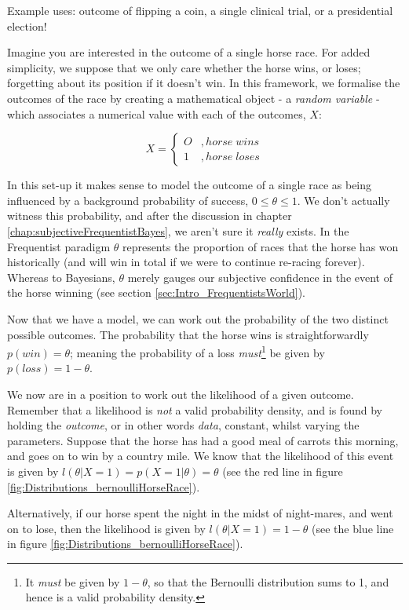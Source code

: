 \documentclass[11pt,fullpage]{book}
\begin{document}
Example uses: outcome of flipping a coin, a single clinical trial, or a presidential election!

Imagine you are interested in the outcome of a single horse race. For added simplicity, we suppose that we only care whether the horse wins, or loses; forgetting about its position if it doesn't win. In this framework, we formalise the outcomes of the race by creating a mathematical object - a \textit{random variable} - which associates a numerical value with each of the outcomes, $X$:

\begin{equation}
X =
\begin{cases}
O & , horse\; wins \\
1 & , horse\; loses
\end{cases}
\end{equation}

In this set-up it makes sense to model the outcome of a single race as being influenced by a background probability of success, $0\leq\theta\leq 1$. We don't actually witness this probability, and after the discussion in chapter \ref{chap:subjectiveFrequentistBayes}, we aren't sure it \textit{really} exists. In the Frequentist paradigm $\theta$ represents the proportion of races that the horse has won historically (and will win in total if we were to continue re-racing forever). Whereas to Bayesians, $\theta$ merely gauges our subjective confidence in the event of the horse winning (see section \ref{sec:Intro_FrequentistsWorld}).

Now that we have a model, we can work out the probability of the two distinct possible outcomes. The probability that the horse wins is straightforwardly $p(win)=\theta$; meaning the probability of a loss \textit{must}\footnote{It \textit{must} be given by $1-\theta$, so that the Bernoulli distribution sums to 1, and hence is a valid probability density.} be given by $p(loss)=1-\theta$.

We now are in a position to work out the likelihood of a given outcome. Remember that a likelihood is \textit{not} a valid probability density, and is found by holding the \textit{outcome}, or in other words \textit{data}, constant, whilst varying the parameters. Suppose that the horse has had a good meal of carrots this morning, and goes on to win by a country mile. We know that the likelihood of this event is given by $l(\theta|X=1)=p(X=1|\theta)=\theta$ (see the red line in figure \ref{fig:Distributions_bernoulliHorseRace}).

Alternatively, if our horse spent the night in the midst of night-mares, and went on to lose, then the likelihood is given by $l(\theta|X=1)=1-\theta$ (see the blue line in figure \ref{fig:Distributions_bernoulliHorseRace}).
\end{document}
